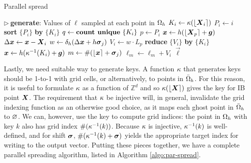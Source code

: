 \begin{algorithm}
\caption{Parallel spread}
\label{algo:par-spread}
\begin{algorithmic}[1]
\State $\triangleright\ $\textbf{generate}: Values of $\ell$ sampled at each point in $\Omega_h$
 \label{line:par-spread-ps} 
    \State $K_i \gets \kappa(\left\lfloor{\boldsymbol{X}_i}\right\rceil)$ 
    \State $P_i \gets i$ 
\EndFor
\State \textbf{sort} $\{P_i\}$ \textbf{by} $\{K_i\}$  \label{line:par-spread-sort}
\State $q \gets \text{\textbf{count unique} }\{K_i\}$ \label{line:par-spread-q}
 \label{line:par-spread-shifts} 
     \label{line:par-spread-v} 
        \State $p \gets P_i$
        \State $\boldsymbol{x} \gets h(\left\lfloor{\boldsymbol{X}_p}\right\rceil+\boldsymbol{g})$
        \State $\Delta\boldsymbol{x} \gets \boldsymbol{x}-\boldsymbol{X}_i$
        \State $w \gets \delta_h(\Delta\boldsymbol{x}+h\boldsymbol{\sigma}_j)$
        \State $V_i \gets w \cdot L_p$
    \EndFor \label{line:par-spread-vend}
    \State \textbf{reduce} $\{V_i\}$ \textbf{by} $\{K_i\}$ \label{line:par-spread-reduce} 
     \label{line:par-spread-quse}
        \State $\boldsymbol{x} \gets h(\kappa^{-1}(K_i) + \boldsymbol{g})$
        \State $m \gets \#(\left\lfloor{\boldsymbol{x}}\right\rceil + \boldsymbol{\sigma}_j)$ 
            \State $\ell_m \gets \ell_m + V_i$
        \EndIf
    \EndFor \label{line:par-spread-wend}
\EndFor
\State \Return $\vec{\ell}$
\EndProcedure
\end{algorithmic}
\end{algorithm}

Lastly, we need suitable way to generate keys. A function $\kappa$ that generates keys
should be 1-to-1 with grid cells, or alternatively, to points in $\bar{\Omega}_h$. For
this reason, it is useful to formulate $\kappa$ as a function of $\mathbb{Z}^d$ and so
$\kappa(\left\lfloor{\boldsymbol{X}}\right\rceil)$ gives the key for IB point $\boldsymbol{X}$. The requirement that $\kappa$ be
injective will, in general, invalidate the grid indexing function as an otherwise good
choice, as it maps each ghost point in $\bar{\Omega}_h$ to $\varnothing$. We can, however,
use the key to compute grid indices: the point in $\Omega_h$ with key $k$ also has grid
index $\#(\kappa^{-1}(k))$. Because $\kappa$ is injective, $\kappa^{-1}(k)$ is well-defined,
and for shift $\boldsymbol{\sigma}$, $\#(\kappa^{-1}(k)+\boldsymbol{\sigma})$ yields the appropriate target index for
writing to the output vector. Putting these pieces together, we have a complete parallel
spreading algorithm, listed in Algorithm \ref{algo:par-spread}.

